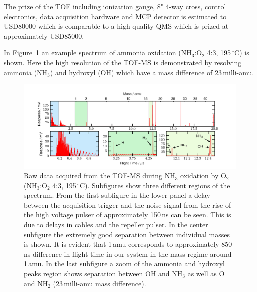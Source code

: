 \documentclass[aip,rsi]{revtex4-1}
\begin{document}
The prize of the TOF including ionization gauge, 8" 4-way cross, control electronics, data acquisition hardware and MCP detector is estimated to USD80000 which is comparable to a high quality QMS which is prized at approximately USD85000.

In Figure~\ref{fig:untreated_data} an example spectrum of ammonia oxidation (NH$_3$:O$_2$ 4:3, 195\,$^{\circ}$C) is shown. Here the high resolution of the TOF-MS is demonstrated by resolving ammonia (NH$_3$) and hydroxyl (OH) which have a mass difference of 23\,milli-amu.
\begin{figure}
 \includegraphics[width=16cm]{untreated_data.png}%
 \caption{Raw data acquired from the TOF-MS during NH$_3$ oxidation by O$_2$ (NH$_3$:O$_2$ 4:3, 195\,$^{\circ}$C). Subfigures show three different regions of the spectrum. From the first subfigure in the lower panel a delay between the acquisition trigger and the noise signal from the rise of the high voltage pulser of approximately 150\,ns can be seen. This is due to delays in cables and the repeller pulser. In the center subfigure the extremely good separation between individual masses is shown. It is evident that 1\,amu corresponds to approximately 850\,ns difference in flight time in our system in the mass regime around 1\,amu. In the last subfigure a zoom of the ammonia and hydroxyl peaks region shows separation between OH and NH$_3$ as well as O and NH$_2$  (23\,milli-amu mass difference).\label{fig:untreated_data}}%
\end{figure}
\end{document}
